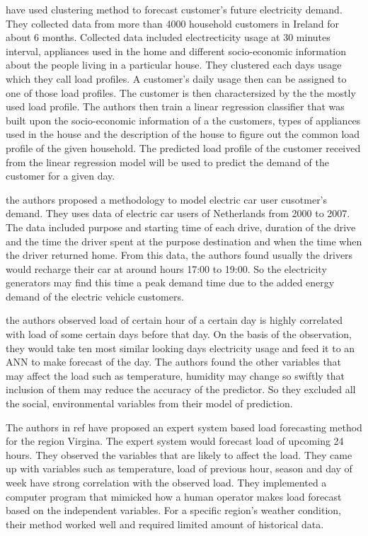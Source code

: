 \cite{mcloughlin2015clustering} have used clustering method to forecast customer's future electricity demand. They collected data from more than 4000 household customers in Ireland for about 6 months. Collected data included electrecticity usage at 30 minutes interval, appliances used in the home and different socio-economic information about the people living in a particular house. They clustered each days usage which they call load profiles. A customer's daily usage then can be assigned to one of those load profiles. The customer is then charactersized by the the mostly used load profile. The authors then train a linear regression classifier that was built upon the socio-economic information of a the customers, types of appliances used in the house and the description of the house to figure out the common load profile of the given household. The predicted load profile of the customer received from the linear regression model will be used to predict the demand of the customer for a given day.
 

\cite{lampropoulos2010methodology} the authors proposed a methodology to model electric car user cusotmer's demand. They uses data of electric car users of Netherlands from 2000 to 2007. The data included purpose and starting time of each drive, duration of the drive and the time the driver spent at the purpose destination and when the time when the driver returned home. From this data, the authors found usually the drivers would recharge their car at around hours 17:00 to 19:00. So the electricity generators may find this time a peak demand time due to the added energy demand of the electric vehicle customers. 

\cite{liu2006accurate} the authors observed load of certain hour of a certain day is highly correlated with load of some certain days before that day. On the basis of the observation, they would take ten most similar looking days electricity usage and feed it to an ANN to make forecast of the day. The authors found the other variables that may affect the load such as temperature, humidity may change so swiftly that inclusion of them may reduce the accuracy of the predictor. So they excluded all the social, environmental variables from their model of prediction.

The authors in ref \cite{rahman1988expert} have proposed an expert system based load forecasting method for the region Virgina. The expert system would forecast load of upcoming 24 hours. They observed the variables that are likely to affect the load. They came up with variables such as temperature, load of previous hour, season and day of week have strong correlation with the observed load. They implemented a computer program that mimicked how a human operator makes load forecast based on the independent variables. For a specific region's weather condition, their method worked well and required limited amount of historical data.

